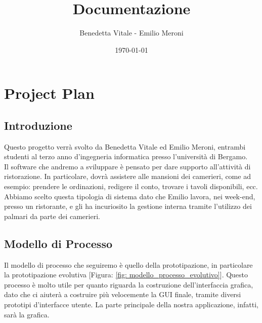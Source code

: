 \documentclass[12pt, letterpaper]{book}
\title{Documentazione}
\author{Benedetta Vitale - Emilio Meroni}
\date{\today}
\begin{document}
\maketitle

\tableofcontents

\chapter{Project Plan}

\section{Introduzione}

Questo progetto verrà svolto da Benedetta Vitale ed Emilio Meroni, entrambi studenti al terzo anno d'ingegneria informatica presso l'università di Bergamo.\\

Il software che andremo a sviluppare è pensato per dare supporto
all'attività di ristorazione. In particolare, dovrà assistere alle mansioni dei camerieri, come ad esempio: prendere le ordinazioni, redigere il conto, trovare i tavoli disponibili, ecc.\\

Abbiamo scelto questa tipologia di sistema dato che Emilio lavora, nei week-end, presso un ristorante, e gli ha incuriosito la gestione interna tramite l'utilizzo dei palmari da parte dei camerieri.
\begin{tabbing}

\end{tabbing}

\section{Modello di Processo}

Il modello di processo che seguiremo è quello della prototipazione, in particolare la prototipazione evolutiva [Figura: \ref{fig: modello_processo_evolutivo}]. Questo processo è molto utile per quanto riguarda la costruzione dell'interfaccia grafica, dato che ci aiuterà a costruire più velocemente la GUI finale, tramite diversi prototipi d'interfacce utente. La parte principale della nostra applicazione, infatti, sarà la grafica.
\end{document}
